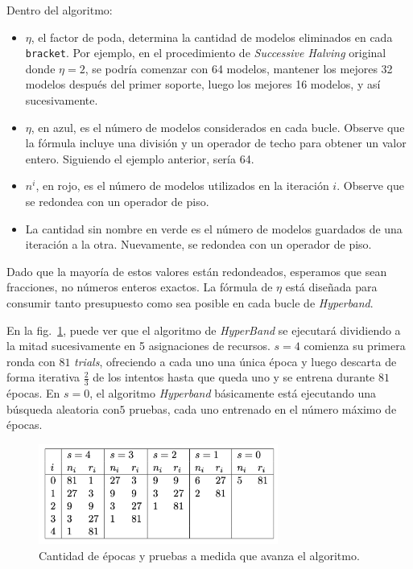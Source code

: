 \documentclass[a4paper,12pt]{article}
\begin{document}
Dentro del algoritmo:
\begin{itemize}[noitemsep, topsep=2pt]
	\item $\eta$, el factor de poda, determina la cantidad de modelos eliminados en cada \texttt{bracket}. Por ejemplo, en el procedimiento de \textit{Successive Halving} original donde $\eta = 2$, se podría comenzar con 64 modelos, mantener los mejores 32 modelos después del primer soporte, luego los mejores 16 modelos, y así sucesivamente.
	\item $\eta$, en azul, es el número de modelos considerados en cada bucle. Observe que la fórmula incluye una división y un operador de techo para obtener un valor entero. Siguiendo el ejemplo anterior, sería 64.
	\item $n^i$, en rojo, es el número de modelos utilizados en la iteración $i$. Observe que se redondea con un operador de piso.
	\item La cantidad sin nombre en verde es el número de modelos guardados de una iteración a la otra. Nuevamente, se redondea con un operador de piso.
\end{itemize}

Dado que la mayoría de estos valores están redondeados, esperamos que sean fracciones, no números enteros exactos. La fórmula de $\eta$ está diseñada para consumir tanto presupuesto como sea posible en cada bucle de \textit{Hyperband}.

En la fig.~\ref{fig:hyper_epochs_trials}, puede ver que el algoritmo de \textit{HyperBand} se ejecutará dividiendo a la mitad sucesivamente en 5 asignaciones de recursos. $s=4$ comienza su primera ronda con $81$ \textit{trials}, ofreciendo a cada uno una única época y luego descarta de forma iterativa $\frac{2}{3}$ de los intentos hasta que queda uno y se entrena durante $81$ épocas. En $s=0$, el algoritmo \textit{Hyperband} básicamente está ejecutando una búsqueda aleatoria con$ 5$ pruebas, cada uno entrenado en el número máximo de épocas.

\begin{figure}[H]
	\begin{center}
	\includegraphics[width=0.7\textwidth]{hyper_trials_vs_epochs.png}
  	\caption{Cantidad de épocas y pruebas a medida que avanza el algoritmo.}
  	\label{fig:hyper_epochs_trials}
  	\end{center}
\end{figure}
\end{document}
